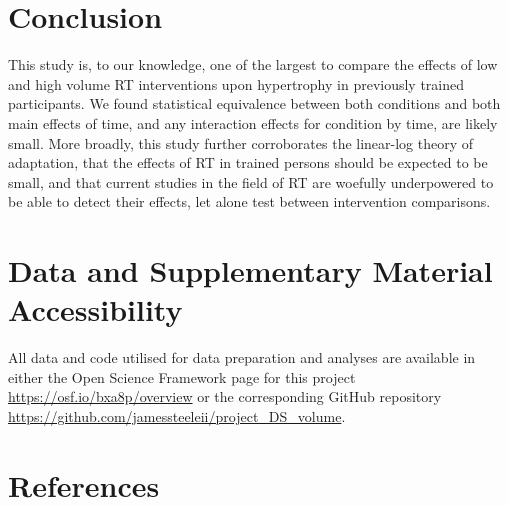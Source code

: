 \documentclass[
]{article}
\begin{document}
\section{Conclusion}\label{conclusion}

This study is, to our knowledge, one of the largest to compare the
effects of low and high volume RT interventions upon hypertrophy in
previously trained participants. We found statistical equivalence
between both conditions and both main effects of time, and any
interaction effects for condition by time, are likely small. More
broadly, this study further corroborates the linear-log theory of
adaptation, that the effects of RT in trained persons should be expected
to be small, and that current studies in the field of RT are woefully
underpowered to be able to detect their effects, let alone test between
intervention comparisons.

\section{Data and Supplementary Material
Accessibility}\label{data-and-supplementary-material-accessibility}

All data and code utilised for data preparation and analyses are
available in either the Open Science Framework page for this project
\url{https://osf.io/bxa8p/overview} or the corresponding GitHub
repository \url{https://github.com/jamessteeleii/project_DS_volume}.

\section{References}\label{references}
\end{document}
